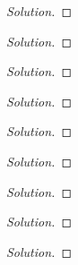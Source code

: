 \begin{exercise}
\end{exercise}
\begin{proof}[Solution]
\end{proof}

\begin{exercise}
\end{exercise}
\begin{proof}[Solution]
\end{proof}

\begin{exercise}
\end{exercise}
\begin{proof}[Solution]
\end{proof}

\begin{exercise}
\end{exercise}
\begin{proof}[Solution]
\end{proof}

\begin{exercise}
\end{exercise}
\begin{proof}[Solution]
\end{proof}

\begin{exercise}
\end{exercise}
\begin{proof}[Solution]
\end{proof}

\begin{exercise}
\end{exercise}
\begin{proof}[Solution]
\end{proof}

\begin{exercise}
\end{exercise}
\begin{proof}[Solution]
\end{proof}

\begin{exercise}
\end{exercise}
\begin{proof}[Solution]
\end{proof}

